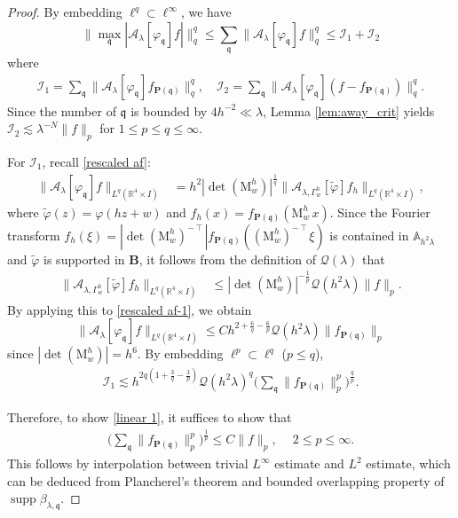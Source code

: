 \documentclass[10pt] %
{amsart}
\theoremstyle{plain}
\numberwithin{equation}{section}
\DeclareMathOperator{\supp}{supp}
\newcommand{\fq}{\mathfrak q}
\begin{document}
\begin{proof}
By embedding $\ell^q \subset \ell^\infty$, we have
\[
\big\|\max_{\fq}|\mathcal A_\lambda [\varphi_{\fq}]f|\big\|_{q}^q
\le \sum_{\fq} \big\|\mathcal A_\lambda [\varphi_{\fq}]f\big\|_q^q
\le \mathcal I_1+\mathcal {I}_2
\]
where
\begin{align*}
\mathcal I_1=\sum_{\fq}\big\|\mathcal A_\lambda    [\varphi_{\fq}]f_{\mathbf P(\fq)}\big\|_q^q, \quad
\mathcal I_2=\sum_{\fq} \big\|\mathcal A_\lambda [\varphi_{\fq}](f-f_{\mathbf P(\fq)})\|_q^q.
\end{align*}
Since the number of $\fq$ is bounded by $4h^{-2} \ll \lambda $,   Lemma \ref{lem:away_crit} yields $\mathcal I_2 \lesssim \lambda^{-N}\|f\|_p$ for $1\le p \le q \le \infty$. 

 
For $\mathcal I_1$,  recall \eqref{rescaled af}:
\begin{align}
  \| \mathcal A_\lambda [\varphi_\fq] f \|_{L^q(\mathbb R^4\times I)}    
 & = h^2 |\det (\mathrm M_w^h)|^{\frac 1q}  \| \mathcal A_{\lambda,\Gamma_{w}^h} [\widetilde\varphi ] f_h \|_{L^q(\mathbb R^4\times I)} , \label{rescaled af-1}
\end{align}
where $\widetilde\varphi (z)  = \varphi( hz+w)$ and 
$f_h(x)=f_{\mathbf P(\fq)}(\mathrm M_w^h\,x)$.
Since the Fourier transform $\widehat{f_h}(\xi) = |\det ( \mathrm M_w^h)^{-\intercal}|  \widehat{f_{\mathbf P(\fq)}}((\mathrm M_w^h)^{-\intercal} \xi)$
is contained in $\mathbb A_{h^2\lambda}$ and $\widetilde\varphi$ is supported in $\mathbf B$,
it follows from the definition of $\mathscr Q(\lambda)$ that
\begin{align*}
\| \mathcal A_{\lambda , \Gamma_{w}^h} [\widetilde\varphi ] f_h \|_{L^q(\mathbb R^4\times I)}  
& \le  |\det (\mathrm M_w^h )|^{ -\frac1p} \mathscr Q  (h^2 \lambda) \|f\|_p .
\end{align*}
By applying this to \eqref{rescaled af-1}, we obtain
\begin{equation*} 
\| \mathcal A_\lambda[\varphi_{\fq} ] f\|_{L^q(\mathbb R^4\times I)} \le C h^{2 + \frac 6q - \frac 6p} \mathscr Q  (h^2 \lambda)  \| f_{\mathbf P(\fq)}\|_{p}
\end{equation*}
 since $|\det (\mathrm M_w^h )| = h^6$. 
By embedding $\ell^p \subset \ell^q$ ($p\le q$),  
\begin{align*}
\mathcal I_1 \lesssim h^{2q(1+\frac3q-\frac3p)}
\mathscr Q(h^2 \lambda)^q
\Big(\sum_{\fq}\|f_{\mathbf P(\fq)}\|_p^p\Big)^{\frac qp}.
\end{align*}


Therefore, to show \eqref{linear 1}, it suffices to show that
\begin{align}\label{little sum}
\big(\sum_{\fq} \big\| f_{\mathbf P(\fq)} \|_p^p \big)^{\frac1p} \le C \|f\|_p,~ \quad  2\le p \le \infty .
\end{align}
This follows by interpolation between trivial $L^\infty$ estimate and $L^2$ estimate, which can be  deduced from Plancherel's theorem and bounded overlapping property of $\supp \beta_{\lambda,\fq}$.


\end{proof}
\end{document}
